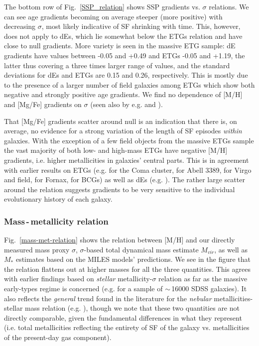 \documentclass[useAMS,usenatbib]{mn2e}
\newcommand{\sig}{$\sigma$}
\begin{document}
The bottom row of Fig.~\ref{SSP_relation} shows SSP gradients vs. {\sig} relations. We can see age gradients becoming on average steeper (more positive) with decreasing {\sig}, most likely indicative of SF shrinking with time. This, however, does not apply to dEs, which lie somewhat below the ETGs relation and have close to null gradients. More variety is seen in the massive ETG sample: dE gradients have values between -0.05 and +0.49 and ETGs  -0.05 and +1.19, the latter thus covering a three times larger range of values, and the standard deviations for dEs and ETGs are 0.15 and 0.26, respectively. This is mostly due to the presence of a larger number of field galaxies among ETGs which show both negative and strongly positive age gradients. We find no dependence of [M/H] and [Mg/Fe] gradients on {\sig} (seen also by e.g. \citealt{kuntschner:2010} and \citealt{koleva:2011}). 

That [Mg/Fe] gradients scatter around null is an indication that there is, on average, no evidence for a strong variation of the length of SF episodes \textit{within} galaxies. With the exception of a few field objects from the massive ETGs sample the vast majority of both low- and high-mass ETGs have negative [M/H] gradients, i.e. higher metallicities in galaxies' central parts. This is in agreement with earlier results on ETGs (e.g.  \citealt{mehlert:2003} for the Coma cluster, \citealt{rawle:2008} for Abell 3389, \citealt{kuntschner:2010} for Virgo and field, \citealt{bedregal:2011} for Fornax, \citealt{loubser:2012} for BCGs) as well as dEs (e.g. \citealt{koleva:2011}). The rather large scatter around the relation suggests gradients to be very sensitive to the individual evolutionary history of each galaxy. 

\subsubsection{Mass\,-\,metallicity relation}

Fig.~\ref{mass-met-relation} shows the relation between [M/H] and our directly measured mass proxy {\sig}, {\sig}-based total dynamical mass estimate $M_{vir}$, as well as $M_*$ estimates based on the MILES models' predictions. We see in the figure that the relation flattens out at higher masses for all the three quantities. This agrees with earlier findings based on \textit{stellar} metallicity-{\sig} relation as far as the massive early-types regime is concerned (e.g. \citealt{graves:2009} for a sample of $\sim$\,16000 SDSS galaxies). It also reflects the \textit{general} trend found in the literature for the \textit{nebular} metallicities-stellar mass relation (e.g. \citealt{ellison:2009}), though we note that these two quantities  are not directly comparable, given the fundamental differences in what they represent (i.e. total metallicities reflecting the entirety of SF of the galaxy vs. metallicities of the present-day gas component). 
\end{document}
